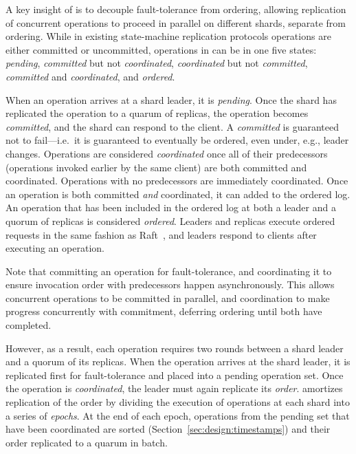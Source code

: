 
A key insight of \sys{} is to decouple fault-tolerance from ordering, allowing
replication of concurrent operations to proceed in parallel on different shards,
separate from ordering. While in existing state-machine replication protocols
operations are either committed or uncommitted, operations in \sys{} can be in
one five states: \textit{pending}, \textit{committed} but not
\textit{coordinated}, \textit{coordinated} but not \textit{committed},
\textit{committed} and \textit{coordinated}, and \textit{ordered}.

When an operation arrives at a shard leader, it is \textit{pending}. Once the
shard has replicated the operation to a quarum of replicas, the operation
becomes \textit{committed}, and the shard can respond to the client. A
\textit{committed} is guaranteed not to fail---i.e.\ it is guaranteed to
eventually be ordered, even under, e.g., leader changes. Operations are
considered \textit{coordinated} once all of their predecessors (operations
invoked earlier by the same client) are both committed and coordinated.
Operations with no predecessors are immediately coordinated. Once an operation
is both committed \emph{and} coordinated, it can added to the ordered log.  An
operation that has been included in the ordered log at both a leader and a
quorum of replicas is considered \textit{ordered}. Leaders and replicas execute
ordered requests in the same fashion as Raft~\cite{ongaro2014raft}, and leaders
respond to clients after executing an operation.

Note that committing an operation for fault-tolerance, and coordinating it to
ensure invocation order with predecessors happen asynchronously. This allows
concurrent operations to be committed in parallel, and coordination to make
progress concurrently with commitment, deferring ordering until both have
completed.

However, as a result, each operation requires two rounds between a shard leader
and a quorum of its replicas. When the operation arrives at the shard leader, it
is replicated first for fault-tolerance and placed into a pending operation set.
Once the operation is \textit{coordinated}, the leader must again replicate its
\emph{order}. \sys{} amortizes replication of the order by dividing the
execution of operations at each shard into a series of \textit{epochs}. At the
end of each epoch, operations from the pending set that have been coordinated
are sorted (Section~\ref{sec:design:timestamps}) and their order replicated to a
quarum in batch.

